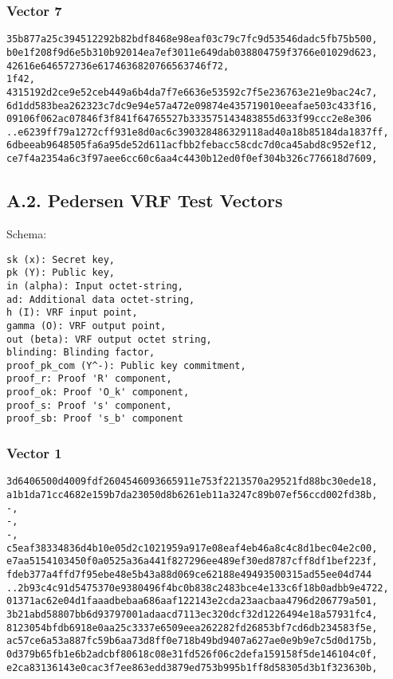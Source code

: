 \documentclass[
]{article}
\begin{document}
\subsubsection{Vector 7}\label{vector-7}

\begin{verbatim}
35b877a25c394512292b82bdf8468e98eaf03c79c7fc9d53546dadc5fb75b500,
b0e1f208f9d6e5b310b92014ea7ef3011e649dab038804759f3766e01029d623,
42616e646572736e6174636820766563746f72,
1f42,
4315192d2ce9e52ceb449a6b4da7f7e6636e53592c7f5e236763e21e9bac24c7,
6d1dd583bea262323c7dc9e94e57a472e09874e435719010eeafae503c433f16,
09106f062ac07846f3f841f64765527b333575143483855d633f99ccc2e8e306
..e6239ff79a1272cff931e8d0ac6c390328486329118ad40a18b85184da1837ff,
6dbeeab9648505fa6a95de52d611acfbb2febacc58cdc7d0ca45abd8c952ef12,
ce7f4a2354a6c3f97aee6cc60c6aa4c4430b12ed0f0ef304b326c776618d7609,
\end{verbatim}

\subsection{A.2. Pedersen VRF Test
Vectors}\label{a.2.-pedersen-vrf-test-vectors}

Schema:

\begin{verbatim}
sk (x): Secret key,
pk (Y): Public key,
in (alpha): Input octet-string,
ad: Additional data octet-string,
h (I): VRF input point,
gamma (O): VRF output point,
out (beta): VRF output octet string,
blinding: Blinding factor,
proof_pk_com (Y^-): Public key commitment,
proof_r: Proof 'R' component,
proof_ok: Proof 'O_k' component,
proof_s: Proof 's' component,
proof_sb: Proof 's_b' component
\end{verbatim}

\subsubsection{Vector 1}\label{vector-1-1}

\begin{verbatim}
3d6406500d4009fdf2604546093665911e753f2213570a29521fd88bc30ede18,
a1b1da71cc4682e159b7da23050d8b6261eb11a3247c89b07ef56ccd002fd38b,
-,
-,
-,
c5eaf38334836d4b10e05d2c1021959a917e08eaf4eb46a8c4c8d1bec04e2c00,
e7aa5154103450f0a0525a36a441f827296ee489ef30ed8787cff8df1bef223f,
fdeb377a4ffd7f95ebe48e5b43a88d069ce62188e49493500315ad55ee04d744
..2b93c4c91d5475370e9380496f4bc0b838c2483bce4e133c6f18b0adbb9e4722,
01371ac62e04d1faaadbebaa686aaf122143e2cda23aacbaa4796d206779a501,
3b21abd58807bb6d93797001adaacd7113ec320dcf32d1226494e18a57931fc4,
8123054bfdb6918e0aa25c3337e6509eea262282fd26853bf7cd6db234583f5e,
ac57ce6a53a887fc59b6aa73d8ff0e718b49bd9407a627ae0e9b9e7c5d0d175b,
0d379b65fb1e6b2adcbf80618c08e31fd526f06c2defa159158f5de146104c0f,
e2ca83136143e0cac3f7ee863edd3879ed753b995b1ff8d58305d3b1f323630b,
\end{verbatim}
\end{document}
